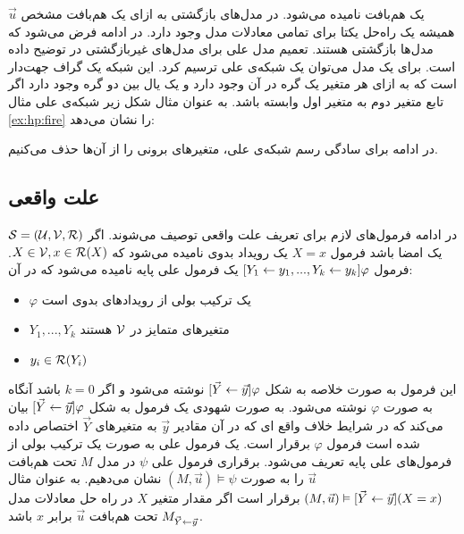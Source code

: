 $\vec u$
یک هم‌بافت
نامیده می‌شود.
در مدل‌های بازگشتی به ازای یک هم‌بافت مشخص همیشه یک راه‌حل یکتا برای تمامی معادلات مدل وجود دارد.
در ادامه فرض می‌شود که مدل‌ها بازگشتی هستند. تعمیم مدل‌ علی برای مدل‌های غیربازگشتی در
\cite{hp}
توضیح داده است.
برای یک مدل می‌توان یک شبکه‌ی علی ترسیم کرد.
این شبکه یک گراف جهت‌دار است که به ازای هر متغیر یک گره در آن وجود دارد و یک یال بین دو گره وجود دارد اگر تابع متغیر دوم به متغیر اول وابسته باشد.
به عنوان مثال شکل زیر شبکه‌ی علی مثال
\ref{ex:hp:fire}
را نشان می‌دهد:
\begin{center}
\end{center}
در ادامه برای سادگی رسم شبکه‌ی علی، متغیر‌های برونی را از آن‌ها حذف می‌کنیم.
\subsection{علت واقعی}
در ادامه‌ فرمول‌های لازم برای تعریف علت واقعی توصیف می‌شوند.
اگر
$\mathcal{S} = (\mathcal{U},\mathcal{V},\mathcal{R})$
یک امضا باشد فرمول
‍‍$X=x$
یک رویداد بدوی
نامیده می‌شود که
‍$X \in \mathcal{V},x \in \mathcal{R}(X)$.
فرمول
$[Y_1 \leftarrow y_1,...,Y_k\leftarrow y_k]\varphi$
یک فرمول علی پایه
نامیده می‌شود که در آن:
\begin{itemize}
      \item $\varphi$
            یک ترکیب بولی از رویداد‌های بدوی است
      \item $Y_1,...,Y_k$
            متغیر‌های متمایز در
            $\mathcal{V}$
            هستند
      \item $y_i \in \mathcal{R}(Y_i)$
\end{itemize}
این فرمول به صورت خلاصه به شکل
$[\vec{Y}\leftarrow \vec{y}]\varphi$
نوشته می‌شود و اگر
$k=0$
باشد آنگاه به صورت
$\varphi$
نوشته می‌شود.
به صورت شهودی یک فرمول به شکل
$[\vec{Y}\leftarrow \vec{y}]\varphi$
بیان می‌کند که در شرایط خلاف واقع‌ ای که در آن مقادیر
$\vec{y}$
به متغیر‌های
$\vec{Y}$
اختصاص داده شده است فرمول
$\varphi$
برقرار است.
یک فرمول علی به صورت یک ترکیب بولی از فرمول‌های علی پایه تعریف می‌شود.
برقراری فرمول علی
$\psi$
در مدل
$M$
تحت هم‌بافت
$\vec u$
را به صورت
$(M,\vec u) \vDash \psi$
نشان می‌دهیم.
به عنوان مثال
$(M,\vec{u}) \vDash [\vec{Y}\leftarrow \vec{y}](X=x)$
برقرار است اگر مقدار متغیر
$X$
در راه حل معادلات مدل
$M_{\vec{Y}\leftarrow \vec{y}}$
تحت هم‌بافت
$\vec u$
برابر
$x$
باشد.

